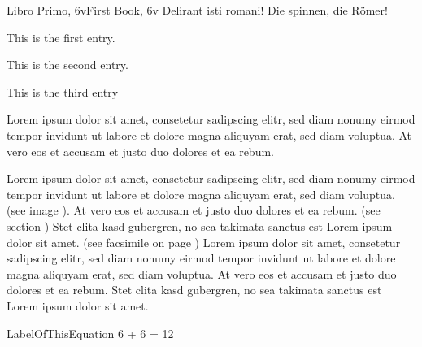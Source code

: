 \begin{EOAtranscripted}{Libro Primo, 6v}{First Book, 6v}
Delirant isti romani!
\EOAnewpage
Die spinnen, die Römer!
\end{EOAtranscripted}


\begin{EOAitems}
    \item This is the first entry.
    \item This is the second entry.
    \item This is the third entry
\end{EOAitems}


Lorem ipsum dolor sit amet, consetetur sadipscing
elitr, sed diam nonumy eirmod tempor invidunt ut
labore et dolore magna aliquyam erat, sed diam
voluptua. At vero eos et accusam et justo duo
dolores et ea rebum.



Lorem ipsum dolor sit amet, consetetur sadipscing
elitr, sed diam nonumy eirmod tempor invidunt ut
labore et dolore magna aliquyam erat, sed diam
voluptua. (see image ). At
vero eos et accusam et justo duo dolores et ea
rebum. (see section ) Stet clita kasd
gubergren, no sea 
 takimata
sanctus est Lorem ipsum dolor sit amet. (see
facsimile on page ) Lorem
ipsum dolor sit amet, consetetur sadipscing elitr,
sed diam nonumy eirmod tempor invidunt ut labore
et dolore magna aliquyam erat, sed diam voluptua.
At vero eos et accusam et justo duo dolores et ea
rebum. Stet clita kasd gubergren, no sea takimata
sanctus est Lorem ipsum dolor sit amet.

\begin{EOAequation}{LabelOfThisEquation}
6 + 6 = 12
\end{EOAequation}

